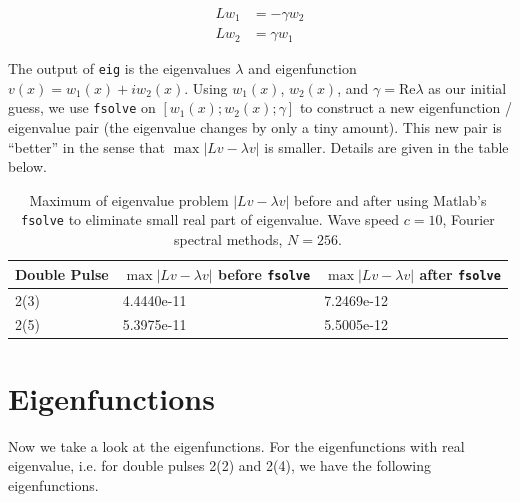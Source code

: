 \documentclass[12pt]{article}
\begin{document}
\begin{enumerate}
\begin{align}\label{realeigproblem}
Lw_1 &= -\gamma w_2 \\
Lw_2 &= \gamma w_1
\end{align}

The output of \texttt{eig} is the eigenvalues $\lambda$ and eigenfunction $v(x) = w_1(x) + i w_2(x)$. Using $w_1(x)$, $w_2(x)$, and $\gamma = \textrm{Re} \lambda$ as our initial guess, we use \texttt{fsolve} on $[w_1(x); w_2(x); \gamma]$ to construct a new eigenfunction / eigenvalue pair (the eigenvalue changes by only a tiny amount). This new pair is ``better'' in the sense that $\max{|Lv - \lambda v|}$ is smaller. Details are given in the table below.

\begin{table}[H]
\begin{tabular}{l|ll}
 Double Pulse   & $\max{|Lv - \lambda v|}$ before \texttt{fsolve} & $\max{|Lv - \lambda v|}$ after \texttt{fsolve}\\ \hline
  2(3) & 4.4440e-11 & 7.2469e-12 \\
  2(5) & 5.3975e-11 & 5.5005e-12 \\
\end{tabular}
\caption{Maximum of eigenvalue problem $|Lv - \lambda v|$ before and after using Matlab's \texttt{fsolve} to eliminate small real part of eigenvalue. Wave speed $c = 10$, Fourier spectral methods, $N = 256$.}
\end{table}

\end{enumerate}

\section{Eigenfunctions}

Now we take a look at the eigenfunctions. For the eigenfunctions with real eigenvalue, i.e. for double pulses 2(2) and 2(4), we have the following eigenfunctions.
\end{document}
